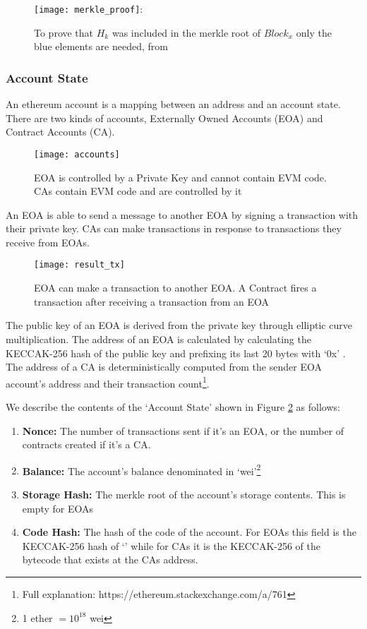 \begin{figure}[H]
    \centering
    \texttt{[image: merkle\_proof]}:
    \caption{To prove that $H_{k}$ was included in the merkle root of $Block_{x}$ only the blue elements are needed, from \cite{smartproperty}}
    \label{merkleproof}
\end{figure}

\subsubsection{Account State}
An ethereum account is a mapping between an address and an account state. There are two kinds of accounts, Externally Owned Accounts (EOA) and Contract Accounts (CA).

\begin{figure}[H]
    \centering
    \texttt{[image: accounts]}
    \caption{EOA is controlled by a Private Key and cannot contain EVM code. CAs contain EVM code and are controlled by it \cite{visual}}
    \label{accounts}
\end{figure}

An EOA is able to send a message to another EOA by signing a transaction with their private key. CAs can make transactions in response to transactions they receive from EOAs. 

\begin{figure}[H]
    \centering
    \texttt{[image: result\_tx]}
    \caption{EOA can make a transaction to another EOA. A Contract fires a transaction after receiving a transaction from an EOA\cite{visual}}
    \label{tx_accounts}
\end{figure}

The public key of an EOA is derived from the private key through elliptic curve multiplication. The address of an EOA is calculated by calculating the KECCAK-256 hash of the public key and prefixing its last 20 bytes with `0x' \cite{ethereum}. The address of a CA is deterministically computed from the sender EOA account's address and their transaction count\footnote{Full explanation: https://ethereum.stackexchange.com/a/761}. 

We describe the contents of the `Account State' shown in Figure \ref{accounts} as follows:
\begin{enumerate}
    \item \textbf{Nonce:} The number of transactions sent if it's an EOA, or the number of contracts created if it's a CA.
    \item \textbf{Balance:} The account's balance denominated in `wei'\footnote{1 ether $= 10^{18}$ wei }
    \item \textbf{Storage Hash:} The merkle root of the account's storage contents. This is empty for EOAs
    \item \textbf{Code Hash:} The hash of the code of the account. For EOAs this field is the KECCAK-256 hash of `' while for CAs it is the KECCAK-256 of the bytecode that exists at the CAs address.
\end{enumerate}

